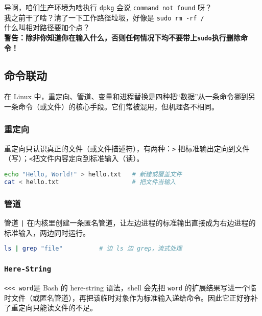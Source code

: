 \begin{warning}
  导啊，咱们生产环境为啥执行 \texttt{dpkg} 会说 \texttt{command not found} 呀？\\
  我之前干了啥？清了一下工作路径垃圾，好像是 \texttt{sudo rm -rf /}\\
  什么叫相对路径要加个点？\\
  {\color{red}\textbf{警告：除非你知道你在输入什么，否则任何情况下均不要带上\texttt{sudo}执行删除命令！}}
\end{warning}

\subsection{命令联动}

在 Linux 中，重定向、管道、变量和进程替换是四种把“数据”从一条命令挪到另一条命令（或文件）的核心手段。它们常被混用，但机理各不相同。

\subsubsection{重定向}

重定向只认识真正的文件（或文件描述符），有两种：\texttt{>} 把标准输出定向到文件（写）；\texttt{<}把文件内容定向到标准输入（读）。
\begin{lstlisting}[language=bash]
echo "Hello, World!" > hello.txt   # 新建或覆盖文件
cat < hello.txt                    # 把文件当输入
\end{lstlisting}

\subsubsection{管道}

管道 \texttt{|} 在内核里创建一条匿名管道，让左边进程的标准输出直接成为右边进程的标准输入，两边同时运行。

\begin{lstlisting}[language=bash]
ls | grep "file"          # 边 ls 边 grep，流式处理
\end{lstlisting}

\subsubsection{\texttt{Here-String}}

\texttt{<<< word}是 Bash 的 here-string 语法，shell 会先把 \texttt{word} 的扩展结果写进一个临时文件（或匿名管道），再把该临时对象作为标准输入递给命令。因此它正好弥补了重定向只能读文件的不足。

